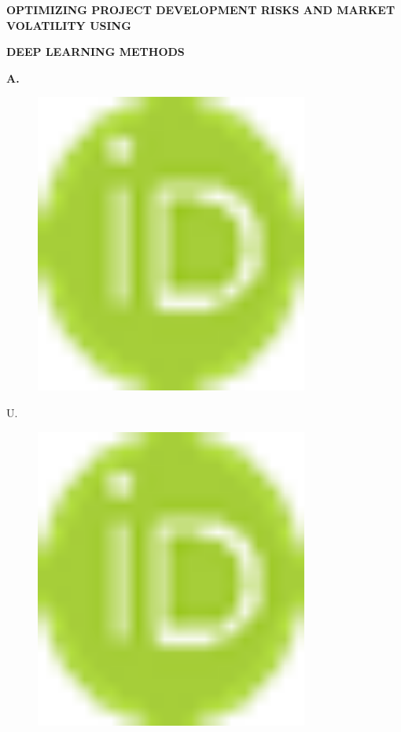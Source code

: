
{\bfseries OPTIMIZING PROJECT DEVELOPMENT RISKS AND MARKET VOLATILITY
USING}

{\bfseries DEEP LEARNING METHODS}

{\bfseries A.
\begin{figure}[H]
	\centering
	\includegraphics[width=0.8\textwidth]{media/ict2/image8}
	\caption*{}
\end{figure}

U.
\begin{figure}[H]
	\centering
	\includegraphics[width=0.8\textwidth]{media/ict2/image8}
	\caption*{}
\end{figure}

}
